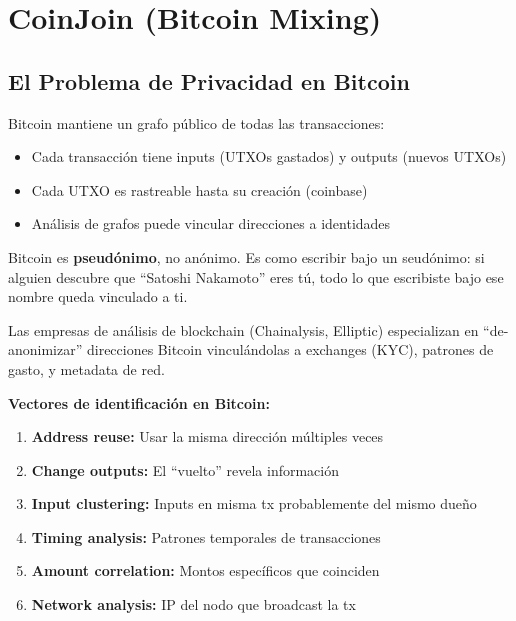 \documentclass[11pt,a4paper,twoside]{book}
\begin{document}
\section{CoinJoin (Bitcoin Mixing)}
\label{sec:coinjoin}

\subsection{El Problema de Privacidad en Bitcoin}

\begin{definition}
Bitcoin mantiene un grafo p\'ublico de todas las transacciones:
\begin{itemize}
    \item Cada transacci\'on tiene inputs (UTXOs gastados) y outputs (nuevos UTXOs)
    \item Cada UTXO es rastreable hasta su creaci\'on (coinbase)
    \item An\'alisis de grafos puede vincular direcciones a identidades
\end{itemize}
\end{definition}

\begin{intuicion}
Bitcoin es \textbf{pseud\'onimo}, no an\'onimo. Es como escribir bajo un seud\'onimo: si alguien descubre que ``Satoshi Nakamoto'' eres t\'u, todo lo que escribiste bajo ese nombre queda vinculado a ti.

Las empresas de an\'alisis de blockchain (Chainalysis, Elliptic) especializan en ``de-anonimizar'' direcciones Bitcoin vincul\'andolas a exchanges (KYC), patrones de gasto, y metadata de red.
\end{intuicion}

\begin{remark}
\textbf{Vectores de identificaci\'on en Bitcoin:}
\begin{enumerate}
    \item \textbf{Address reuse:} Usar la misma direcci\'on m\'ultiples veces
    \item \textbf{Change outputs:} El ``vuelto'' revela informaci\'on
    \item \textbf{Input clustering:} Inputs en misma tx probablemente del mismo due\~no
    \item \textbf{Timing analysis:} Patrones temporales de transacciones
    \item \textbf{Amount correlation:} Montos espec\'ificos que coinciden
    \item \textbf{Network analysis:} IP del nodo que broadcast la tx
\end{enumerate}
\end{remark}
\end{document}
